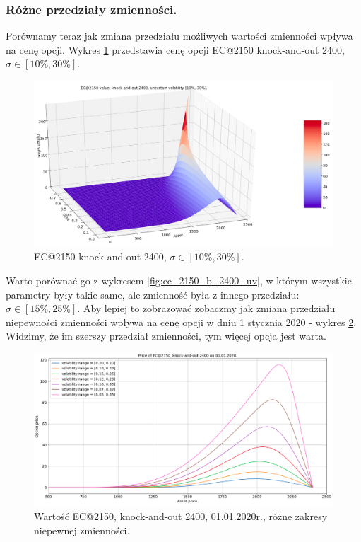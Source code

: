 \documentclass[12pt]{article}
\begin{document}
\subsubsection{Różne przedziały zmienności.}
Porównamy teraz jak zmiana przedziału możliwych wartości zmienności wpływa na cenę opcji. Wykres \ref{fig:ec_2150_b_2400_uv_10_30} przedstawia cenę opcji EC@2150 knock-and-out 2400, $\sigma \in [10\%, 30\%].$ 
\begin{figure}[H]
    \centering
    \includegraphics[width=\textwidth,height=\textheight,keepaspectratio]{ec_2150_b_2400_uv_10_30.png}
    \caption{EC@2150 knock-and-out 2400, $\sigma \in [10\%, 30\%].$}
    \label{fig:ec_2150_b_2400_uv_10_30}
\end{figure}

Warto porównać go z wykresem \ref{fig:ec_2150_b_2400_uv}, w którym wszystkie parametry były takie same, ale  zmienność była z innego przedziału: $\sigma \in [15\%, 25\%].$ Aby lepiej to zobrazować zobaczmy jak zmiana przedziału niepewności zmienności wpływa na cenę opcji w dniu 1 stycznia 2020 - wykres \ref{fig:ec_2150_b_2400_var_vol}. Widzimy, że im szerszy przedział zmienności, tym więcej opcja jest warta. 
\begin{figure}[H]
    \centering
    \includegraphics[width=\textwidth,height=\textheight,keepaspectratio]{ec_2150_b_2400_var_vol.png}
    \caption{Wartość EC@2150, knock-and-out 2400, 01.01.2020r., różne zakresy niepewnej zmienności.}
    \label{fig:ec_2150_b_2400_var_vol}
\end{figure}
\end{document}
